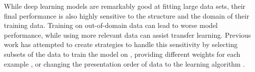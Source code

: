 While deep learning models are remarkably good at fitting large data sets, their final performance is also highly sensitive to the structure and the domain of their training data. Training on out-of-domain data can lead to worse model performance, while using more relevant data can assist transfer learning.
Previous work has attempted to create strategies to handle this sensitivity by selecting subsets of the data to train the model on \citep{jiang-zhai-2007-instance,wang-etal-2017-instance,axelrod2011domain,foster-etal-2010-discriminative,moore2010intelligent}, providing different weights for each example \citep{importance_weight,learn_reweight}, or changing the presentation order of data to the learning algorithm \citep{cl_bengio,rl_nmt}.

